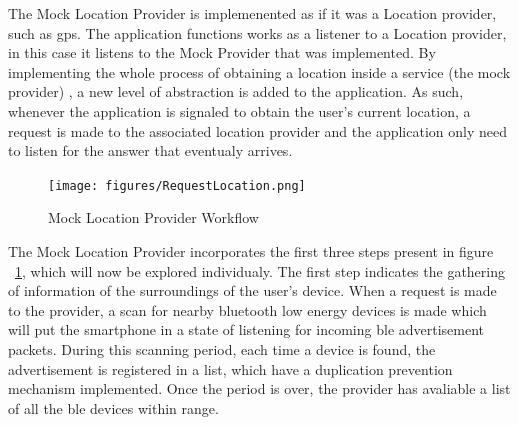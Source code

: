 \documentclass[a4paper]{IEEEtran}
\begin{document}
The Mock Location Provider is implemenented as if it was a Location provider, such as gps. The application functions works as a listener to a Location provider, in this case it listens to the Mock Provider that was implemented. By implementing the whole process of obtaining a location inside a service (the mock provider) , a new level of abstraction is added to the application. As such, whenever the application is signaled to obtain the user's current location, a request is made to the associated location provider and the application only need to listen for the answer that eventualy arrives.

\begin{figure}
	\centering
		\texttt{[image: figures/RequestLocation.png]}
	\caption[Mock Location Provider Workflow]{Mock Location Provider Workflow}
	\label{fig:MockProvider}
\end{figure}

The Mock Location Provider incorporates the first three steps present in figure ~\ref{fig:MockProvider}, which will now be explored individualy. The first step indicates the gathering of information of the surroundings of the user's device. When a request is made to the provider, a scan for nearby bluetooth low energy devices is made which will put the smartphone in a state of listening for incoming ble advertisement packets. During this scanning period, each time a device is found, the advertisement is registered in a list, which have a duplication prevention mechanism implemented. Once the period is over, the provider has avaliable a list of all the ble devices within range.   
\end{document}
